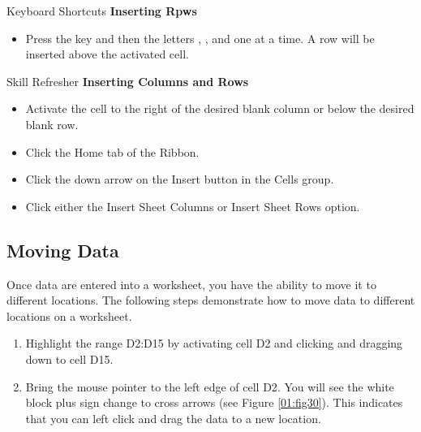 \begin{center}
	\begin{shtcutbox}{Keyboard Shortcuts}
		\textbf{Inserting Rpws}
		\\
		\begin{itemize}
			\setlength{\itemsep}{0pt}
			\setlength{\parskip}{0pt}
			\setlength{\parsep}{0pt}
			
			\item Press the  key and then the letters , , and  one at a time. A row will be inserted above the activated cell.
			
		\end{itemize}
	\end{shtcutbox}
\end{center}

\begin{center}
	\begin{sklbox}{Skill Refresher}
		\textbf{Inserting Columns and Rows}
		\\
		\begin{itemize}
			\setlength{\itemsep}{0pt}
			\setlength{\parskip}{0pt}
			\setlength{\parsep}{0pt}
			
			\item Activate the cell to the right of the desired blank column or below the desired blank row.
			\item Click the Home tab of the Ribbon.
			\item Click the down arrow on the Insert button in the Cells group.
			\item Click either the Insert Sheet Columns or Insert Sheet Rows option.
			
		\end{itemize}
	\end{sklbox}
\end{center}


\subsection{Moving Data}

Once data are entered into a worksheet, you have the ability to move it to different locations. The following steps demonstrate how to move data to different locations on a worksheet.

\begin{enumerate}
	\item Highlight the range \textsf{D2:D15} by activating cell \textsf{D2} and clicking and dragging down to cell \textsf{D15}.
	\item Bring the mouse pointer to the left edge of cell \textsf{D2}. You will see the white block plus sign change to cross arrows (see Figure \ref{01:fig30}). This indicates that you can left click and drag the data to a new location.
\end{enumerate}

